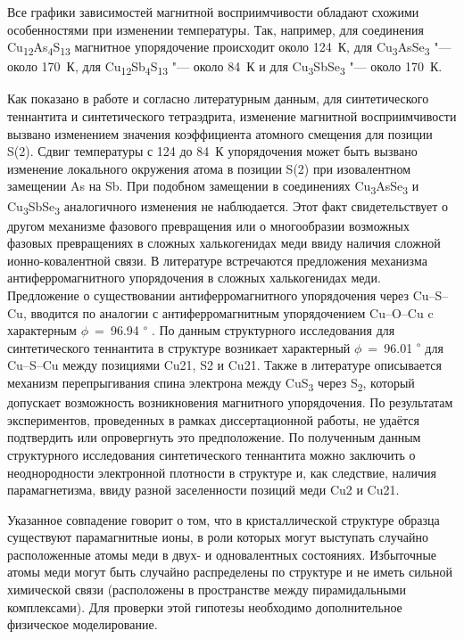 Все графики зависимостей магнитной восприимчивости обладают схожими особенностями при изменении температуры. Так, например, для соединения Cu\textsubscript{12}As\textsubscript{4}S\textsubscript{13} магнитное упорядочение происходит около 124~К, для Cu\textsubscript{3}AsSe\textsubscript{3} "--- около 170~К, для Cu\textsubscript{12}Sb\textsubscript{4}S\textsubscript{13}  "--- около 84~К и для Cu\textsubscript{3}SbSe\textsubscript{3}	 "--- около 170~К. 

Как показано в работе и согласно литературным данным\cite{Nasonova2016}, для синтетического теннантита и синтетического тетраэдрита, изменение магнитной восприимчивости вызвано изменением значения коэффициента атомного смещения для позиции S(2). Сдвиг температуры с 124 до 84~К упорядочения может быть вызвано изменение локального окружения атома в позиции S(2) при изовалентном замещении As на Sb. 
При подобном замещении в соединениях Cu\textsubscript{3}AsSe\textsubscript{3} и Cu\textsubscript{3}SbSe\textsubscript{3} аналогичного изменения не наблюдается. Этот факт свидетельствует о другом механизме фазового превращения или о многообразии возможных фазовых превращениях в сложных халькогенидах меди ввиду наличия сложной ионно-ковалентной связи.
В литературе встречаются предложения механизма антиферромагнитного упорядочения в сложных халькогенидах меди. Предложение о существовании антиферромагнитного упорядочения через Cu--S--Cu, вводится по аналогии с антиферромагнитным упорядочением Cu--O--Cu\cite{Crawford1976} c характерным $\phi$~=~96.94\textsuperscript{ $\circ$ }. По данным структурного исследования для синтетического теннантита в структуре возникает характерный $\phi$~=~96.01\textsuperscript{ $\circ$ } для Cu--S--Cu между позициями Cu21, S2 и Cu21. Также в литературе описывается механизм\cite{Gainov2008,Gainov_2006} перепрыгивания спина электрона между CuS\textsubscript{3} через S\textsubscript{2}, который допускает возможность возникновения магнитного упорядочения. По результатам экспериментов, проведенных в рамках диссертационной работы, не удаётся подтвердить или опровергнуть это предположение. По полученным данным структурного исследования синтетического теннантита можно заключить о неоднородности электронной плотности в структуре и, как следствие, наличия парамагнетизма, ввиду разной заселенности позиций меди Cu2 и Cu21. 


Указанное совпадение говорит о том, что в кристаллической структуре образца существуют парамагнитные ионы, в роли которых могут выступать случайно расположенные атомы меди в двух- и одновалентных состояниях.
Избыточные атомы меди могут быть случайно распределены по структуре и не иметь сильной химической связи (расположены в пространстве между пирамидальными комплексами). 
Для проверки этой гипотезы необходимо дополнительное физическое моделирование.

